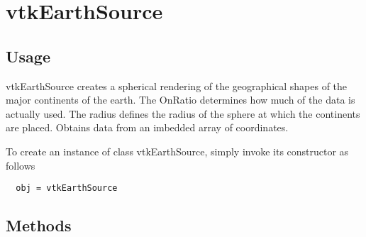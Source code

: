\section{vtkEarthSource}

\subsection{Usage}

 vtkEarthSource creates a spherical rendering of the geographical shapes
 of the major continents of the earth. The OnRatio determines
 how much of the data is actually used. The radius defines the radius
 of the sphere at which the continents are placed. Obtains data from
 an imbedded array of coordinates.

To create an instance of class vtkEarthSource, simply
invoke its constructor as follows
\begin{verbatim}
  obj = vtkEarthSource
\end{verbatim}
\subsection{Methods}

